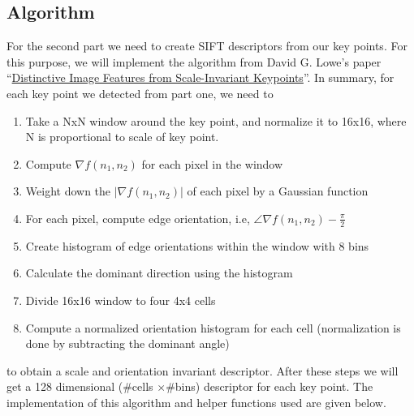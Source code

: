 \documentclass{article}
\begin{document}
\subsection{Algorithm}
For the second part we need to create SIFT descriptors from our key points. For this purpose, we will implement the algorithm from David G. Lowe's paper ``\href{https://www.cs.ubc.ca/~lowe/papers/ijcv04.pdf}{Distinctive Image Features from Scale-Invariant Keypoints}''.
In summary, for each key point we detected from part one, we need to 
\begin{enumerate}
\item Take a NxN window around the key point, and normalize it to 16x16, where N is proportional to scale of key point.
\item Compute $ \nabla f(n_{1}, n_{2}) $ for each pixel in the window
\item Weight down the  $|\nabla f(n_{1}, n_{2})| $ of each pixel by a Gaussian function
\item For each pixel, compute edge orientation, i.e, $ \angle \nabla f(n_{1}, n_{2}) - \frac{\pi}{2}$ 
\item Create histogram of edge orientations within the window with 8 bins
\item Calculate the dominant direction using the histogram
\item Divide 16x16 window to four 4x4 cells
\item Compute a normalized orientation histogram for each cell (normalization is done by subtracting the dominant angle)
\end{enumerate}
to obtain a scale and orientation invariant descriptor. After these steps we will get a 128 dimensional (\#cells $\times $\#bins) descriptor for each key point. The implementation of this algorithm and helper functions used are given below.
\end{document}
